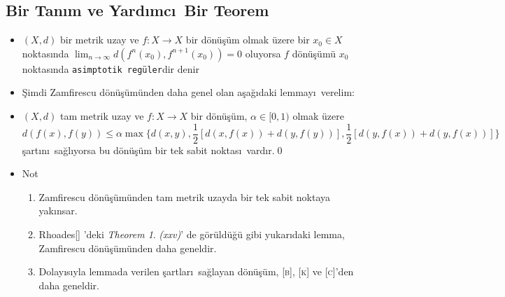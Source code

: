 \documentclass[sans,mathserif,8pt]{beamer}
\begin{document}
\subsection{Bir Tan\i m ve Yard\i mc\i\ Bir Teorem}
\begin{frame}
\begin{itemize}[<+-| alert@+>]  
 
  \item[] \begin{definition}
    $(X, d)$ bir metrik uzay ve $f:X\to X$ bir d\"{o}n\"{u}\c{s}\"{u}m olmak \"uzere bir $x_0 \in X$ noktas\i nda $\lim_{n\to \infty} d(f^n
(x_0), f^{n+1} (x_0 )) = 0$ oluyorsa $f$ d\"{o}n\"{u}\c{s}\"{u}m\"u $x_0$ noktas\i nda \texttt{asimptotik reg\"uler}dir denir
  \end{definition}

 \item[] \c{S}imdi Zamfirescu d\"{o}n\"{u}\c{s}\"{u}m\"{u}nden daha genel olan a\c{s}a\u{g}\i daki lemmay\i\ verelim:

 \item[] \begin{lemma}
  $(X,d)$ tam metrik uzay ve $f: X \rightarrow X$ bir d\"{o}n\"{u}\c{s}\"{u}m,
  $\alpha \in [0,1)$ olmak \"uzere
  \begin{equation*}
    d(f(x), f(y))\leq \alpha\max\bigg\{ d(x,y), \frac{1}{2}[d(x,f(x))+d(y,f(y))], \frac{1}{2}[d(y,f(x))+d(y,f(x))] \bigg\} 
  \end{equation*}
  \c{s}art\i n\i\ sa\u{g}l\i yorsa bu d\"{o}n\"{u}\c{s}\"{u}m bir tek sabit noktas\i\ vard\i r.\qed
\end{lemma}

  \item[] \begin{block}{Not}
  \begin{enumerate}
  \item Zamfirescu d\"{o}n\"{u}\c{s}\"{u}m\"{u}nden tam metrik uzayda bir tek sabit noktaya yak\i nsar.
  \item Rhoades[] 'deki \emph{Theorem 1}. \emph{(xxv)}' de  g\"or\"uld\"u\u{g}\"u gibi yukar\i daki lemma,  Zamfirescu d\"{o}n\"{u}\c{s}\"{u}m\"{u}nden daha geneldir.  \item Dolay\i s\i yla lemmada verilen \c{s}artlar\i\ sa\u{g}layan d\"{o}n\"{u}\c{s}\"{u}m, \textsc{[b]}, \textsc{[k]} ve \textsc{[c]}'den daha geneldir.
\end{enumerate}
\end{block}
\end{itemize}

\end{frame}%
\end{document}
